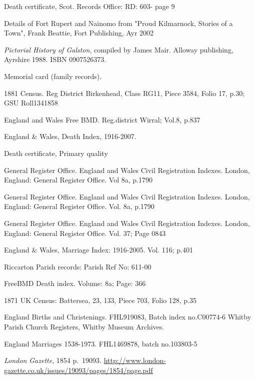 \begin{thebibliography}{99}
	Death certificate, Scot. Records Office: RD: 603- page 9

	Details of Fort Rupert and Nainomo from "Proud Kilmarnock, Stories of a Town", Frank Beattie, Fort Publishing, Ayr 2002

	\emph{Pictorial History of Galston}, compiled by James Mair. Alloway publishing, Ayrshire 1988. ISBN 0907526373.

	 Memorial card (family records).

	1881 Census. Reg District Birkenhead, Class RG11, Piece 3584, Folio 17, p.30; GSU Roll1341858

	England and Wales Free BMD. Reg.district Wirral; Vol.8, p.837

	England \& Wales, Death Index, 1916-2007.

	Death certificate, Primary quality

	General Register Office. England and Wales Civil Registration Indexes. London, England: General Register 		Office. Vol 8a, p.1790

	General Register Office. England and Wales Civil Registration Indexes. London, England: General Register 		Office. Vol. 8a, p.1790

	General Register Office. England and Wales Civil Registration Indexes. London, England: General Register 		Office. Vol. 37; Page 0843

	England \& Wales, Marriage Index: 1916-2005. Vol. 116; p.401

	Riccarton Parish records: Parish Ref No: 611-00

	FreeBMD Death index. Volume: 8a; Page: 366

	1871 UK Census: Battersea, 23, 133, Piece 703, Folio 128, p.35

	 England Births and Christenings. FHL919083, Batch index no.C00774-6
	 Whitby Parish Church Registers, Whitby Museum Archives.

	England Marriages 1538-1973. FHL1469878, batch no.103803-5

	\emph{London Gazette}, 1854 p.~19093.
	\url{http://www.london-gazette.co.uk/issues/19093/pages/1854/page.pdf}


\end{thebibliography}

